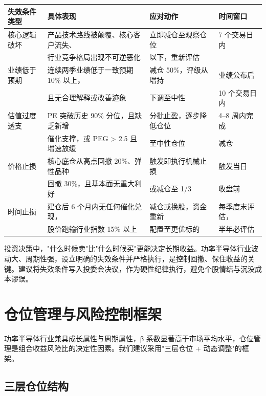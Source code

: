 \begin{exhibitbox}[表 10-5：失效条件与止损纪律]
\centering
\small
\begin{tabularx}{\textwidth}{L{2.2cm} L{5.0cm} L{3.0cm} L{2.8cm}}
\toprule
\textbf{失效条件类型} & \textbf{具体表现} & \textbf{应对动作} & \textbf{时间窗口} \\
\midrule
核心逻辑破坏 & 产品技术路线被颠覆、核心客户流失、 & 立即减仓至观察仓位 & 7 个交易日内 \\
& 行业竞争格局出现不可逆恶化 & 以下，重新评估 & \\
\midrule
业绩低于预期 & 连续两季业绩低于一致预期 10\% 以上， & 减仓 50\%，评级从增持 & 业绩公布后 \\
& 且无合理解释或改善迹象 & 下调至中性 & 10 个交易日内 \\
\midrule
估值过度透支 & PE 突破历史 90\% 分位，且缺乏新增 & 分批止盈，逐步降低仓位 & 4–8 周内完成 \\
& 催化支撑，或 PEG > 2.5 且增速放缓 & 至中性仓位 & 减仓 \\
\midrule
价格止损 & 核心底仓从高点回撤 20\%、弹性品种 & 触发即执行机械止损 & 触发当日 \\
& 回撤 30\%，且基本面无重大利好 & 或减仓至 1/3 & 收盘前 \\
\midrule
时间止损 & 建仓后 6 个月内无任何催化兑现， & 减仓或换股，资金重新 & 每季度末评估， \\
& 股价跑输行业指数 15\% 以上 & 配置至更优标的 & 半年必评估 \\
\bottomrule
\end{tabularx}
\end{exhibitbox}

\begin{keyinsight}[失效条件比买入条件更重要]
投资决策中，"什么时候卖"比"什么时候买"更能决定长期收益。功率半导体行业波动大、周期性强，设立明确的失效条件并严格执行，是控制回撤、保住收益的关键。建议将失效条件写入投委会决议，作为硬性纪律执行，避免个股情结与沉没成本谬误。
\end{keyinsight}

\section{仓位管理与风险控制框架}

功率半导体行业兼具成长属性与周期属性，β 系数显著高于市场平均水平，仓位管理是组合收益风险比的决定性因素。我们建议采用"三层仓位 + 动态调整"的框架。

\subsection{三层仓位结构}

